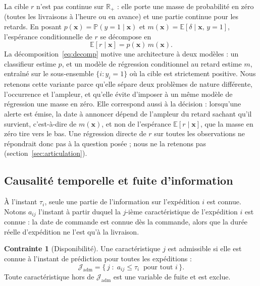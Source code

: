 \documentclass[11pt,a4paper]{article}
\newcommand{\E}{\mathbb{E}}
\newcommand{\Prob}{\mathbb{P}}
\theoremstyle{definition}
\newtheorem{contrainte}{Contrainte}
\begin{document}
La cible $r$ n'est pas continue sur $\mathbb{R}_+$ : elle porte une masse de probabilité en zéro (toutes les livraisons à l'heure ou en avance) et une partie continue pour les retards. En posant $p(\mathbf{x}) = \Prob(y=1 \mid \mathbf{x})$ et $m(\mathbf{x}) = \E[\delta \mid \mathbf{x},\, y=1]$, l'espérance conditionnelle de $r$ se décompose en
\begin{equation}
  \E[r \mid \mathbf{x}] = p(\mathbf{x})\, m(\mathbf{x}).
  \label{eq:decomp}
\end{equation}
La décomposition~\eqref{eq:decomp} motive une architecture à deux modèles : un classifieur estime $p$, et un modèle de régression conditionnel au retard estime $m$, entraîné sur le sous-ensemble $\{i : y_i = 1\}$ où la cible est strictement positive. Nous retenons cette variante parce qu'elle sépare deux problèmes de nature différente, l'occurrence et l'ampleur, et qu'elle évite d'imposer à un même modèle de régression une masse en zéro. Elle correspond aussi à la décision : lorsqu'une alerte est émise, la date à annoncer dépend de l'ampleur du retard sachant qu'il survient, c'est-à-dire de $m(\mathbf{x})$, et non de l'espérance $\E[r \mid \mathbf{x}]$, que la masse en zéro tire vers le bas. Une régression directe de $r$ sur toutes les observations ne répondrait donc pas à la question posée ; nous ne la retenons pas (section~\ref{sec:articulation}).

\subsection{Causalité temporelle et fuite d'information}
\label{sec:causalite}

À l'instant $\tau_i$, seule une partie de l'information sur l'expédition $i$ est connue. Notons $a_{ij}$ l'instant à partir duquel la $j$-ième caractéristique de l'expédition $i$ est connue : la date de commande est connue dès la commande, alors que la durée réelle d'expédition ne l'est qu'à la livraison.

\begin{contrainte}[Disponibilité]
\label{ctr:dispo}
Une caractéristique $j$ est admissible si elle est connue à l'instant de prédiction pour toutes les expéditions :
\begin{equation}
  \mathcal{J}_{\mathrm{adm}} = \bigl\{\, j \;:\; a_{ij} \le \tau_i \ \text{ pour tout } i \,\bigr\}.
  \label{eq:adm}
\end{equation}
Toute caractéristique hors de $\mathcal{J}_{\mathrm{adm}}$ est une variable de fuite et est exclue.
\end{contrainte}
\end{document}
